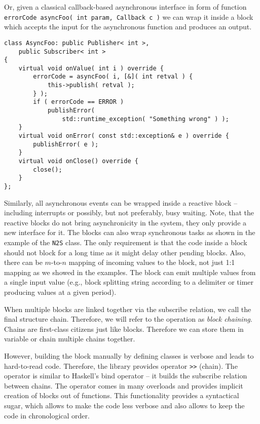 Or, given a classical callback-based asynchronous interface in form of function
\texttt{errorCode asyncFoo( int param, Callback c )} we can
wrap it inside a block which accepts the input for the asynchronous function and
produces an output.
\begin{verbatim}
class AsyncFoo: public Publisher< int >,
    public Subscriber< int >
{
    virtual void onValue( int i ) override {
        errorCode = asyncFoo( i, [&]( int retval ) {
            this->publish( retval );
        } );
        if ( errorCode == ERROR )
            publishError(
                std::runtime_exception( "Something wrong" ) );
    }
    virtual void onError( const std::exception& e ) override {
        publishError( e );
    }
    virtual void onClose() override {
        close();
    }
};
\end{verbatim}

Similarly, all asynchronous events can be wrapped inside a reactive block --
including interrupts or possibly, but not preferably, busy waiting. Note, that
the reactive blocks do not bring asynchronicity in the system, they only provide
a new interface for it. The blocks can also wrap synchronous tasks as shown in
the example of the \texttt{N2S} class. The only requirement is that the code
inside a block should not block for a long time as it might delay other pending
blocks. Also, there can be $m$-to-$n$ mapping of incoming values to the block,
not just 1:1 mapping as we showed in the examples. The block can emit multiple
values from a single input value (e.g., block splitting string according to a
delimiter or timer producing values at a given period).

When multiple blocks are linked together via the subscribe relation, we call the
final structure chain. Therefore, we will refer to the operation as
\emph{block chaining}. Chains are first-class citizens just like blocks.
Therefore we can store them in variable or chain multiple chains together.

However, building the block manually by defining classes is verbose and leads to
hard-to-read code. Therefore, the library provides operator
\texttt{>>} (chain). The operator is similar to Haskell's
bind operator -- it builds the subscribe relation between chains. The operator
comes in many overloads and provides implicit creation of blocks out of
functions. This functionality provides a syntactical sugar, which allows to make
the code less verbose and also allows to keep the code in chronological order.

